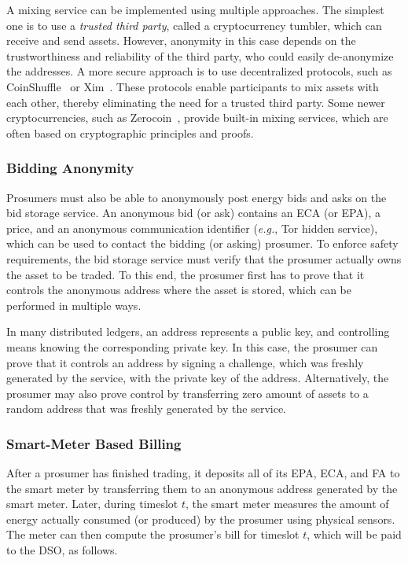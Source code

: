 A mixing service can be implemented using multiple approaches.  The
simplest one is to use a \emph{trusted third party}, called a
cryptocurrency tumbler, which can receive and send assets. However, anonymity
in this case depends on the trustworthiness and reliability
of the third party, who could easily de-anonymize the addresses.  A
more secure approach is to use decentralized protocols, such as
CoinShuffle~\cite{ruffing2014coinshuffle} or
Xim~\cite{bissias2014sybil}.  These protocols enable participants to
mix assets with each other, thereby eliminating the need for a trusted
third party.
Some newer cryptocurrencies, such as
Zerocoin~\cite{miers2013zerocoin}, provide built-in mixing services,
which are often based on cryptographic principles and proofs.

\subsubsection{Bidding Anonymity}
Prosumers must also be able to anonymously post energy bids and asks on the
bid storage service.  An anonymous bid (or ask) contains an ECA (or
EPA), a price, and an anonymous communication identifier (\emph{e.g.},
Tor hidden service), which can be used to contact the bidding (or
asking) prosumer.  To enforce safety requirements, the bid storage
service must verify that the prosumer actually owns the asset to be
traded.  To this end, the prosumer first has to prove that it controls
the anonymous address where the asset is stored, which can be
performed in multiple ways.

In many distributed ledgers, an address represents a public key, and
controlling means knowing the corresponding private key.  In this
case, the prosumer can prove that it controls an address by signing a
challenge, which was freshly generated by the service, with the
private key of the address.  Alternatively, the prosumer may also
prove control by transferring zero amount of assets to a random
address that was freshly generated by the service.

\subsubsection{Smart-Meter Based Billing}
After a prosumer has finished trading, it deposits all of its EPA,
ECA, and FA to the smart meter by transferring them to an anonymous
address generated by the smart meter.  Later, during timeslot $t$, the
smart meter measures the amount of energy actually consumed (or
produced) by the prosumer using physical sensors.  The meter can then
compute the prosumer's bill for timeslot $t$, which will be paid to
the DSO, as follows. 

